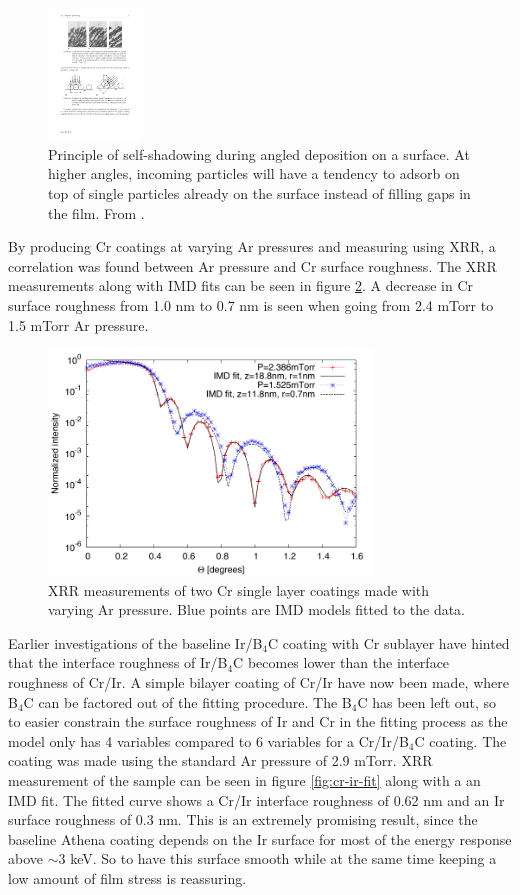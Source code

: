 \begin{figure}[!h]
	\center
	\includegraphics[height=3.5cm]{figures/athena/coatings/self-shadow.pdf}
\caption{\footnotesize Principle of self-shadowing during angled deposition on a surface. At higher angles, incoming particles will have a tendency to adsorb on top of single particles already on the surface instead of filling gaps in the film. From \cite{Dirks:1977uk}.}\label{fig:self-shadow}
\end{figure}

By producing Cr coatings at varying Ar pressures and measuring using XRR, a correlation was found between Ar pressure and Cr surface roughness. The XRR measurements along with IMD fits can be seen in figure \ref{fig:cr-pressure-fit}. A decrease in Cr surface roughness from 1.0 nm to 0.7 nm is seen when going from 2.4 mTorr to 1.5 mTorr Ar pressure.

\begin{figure}[!h]
	\center
	\includegraphics[height=6cm]{figures/athena/coatings/cr-pressure-fit.pdf}
\caption{\footnotesize XRR measurements of two Cr single layer coatings made with varying Ar pressure. Blue points are IMD models fitted to the data.}\label{fig:cr-pressure-fit}
\end{figure}

Earlier investigations of the baseline Ir/B$_4$C coating with Cr sublayer\cite{Jakobsen:2011vd} have hinted that the interface roughness of Ir/B$_4$C becomes lower than the interface roughness of Cr/Ir. A simple bilayer coating of Cr/Ir have now been made, where B$_4$C can be factored out of the fitting procedure. The B$_4$C has been left out, so to easier constrain the surface roughness of Ir and Cr in the fitting process as the model only has 4 variables compared to 6 variables for a Cr/Ir/B$_4$C coating. The coating was made using the standard Ar pressure of 2.9 mTorr. XRR measurement of the sample can be seen in figure \ref{fig:cr-ir-fit} along with a an IMD fit. The fitted curve shows a Cr/Ir interface roughness of 0.62 nm and an Ir surface roughness of 0.3 nm.
This is an extremely promising result, since the baseline Athena coating depends on the Ir surface for most of the energy response above $\sim$3 keV. So to have this surface smooth while at the same time keeping a low amount of film stress is reassuring.

